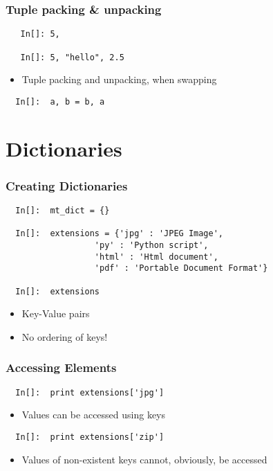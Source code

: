 \begin{frame}[fragile]
  \frametitle{Tuple packing \& unpacking}
  \begin{lstlisting}
   In[]: 5,

   In[]: 5, "hello", 2.5
  \end{lstlisting}
  \begin{itemize}
  \item Tuple packing and unpacking, when swapping
  \end{itemize}
  \begin{lstlisting}
  In[]:  a, b = b, a
  \end{lstlisting}
\end{frame}

\section{Dictionaries}

\begin{frame}[fragile]
  \frametitle{Creating Dictionaries}
  \begin{lstlisting}
  In[]:  mt_dict = {}

  In[]:  extensions = {'jpg' : 'JPEG Image', 
                  'py' : 'Python script', 
                  'html' : 'Html document', 
                  'pdf' : 'Portable Document Format'}

  In[]:  extensions
  \end{lstlisting}
  \begin{itemize}
  \item Key-Value pairs
  \item \alert{ No ordering of keys! }
  \end{itemize}
\end{frame}

\begin{frame}[fragile]
  \frametitle{Accessing Elements}
  \begin{lstlisting}
  In[]:  print extensions['jpg']
  \end{lstlisting}
  \begin{itemize}
  \item Values can be accessed using keys
  \end{itemize}
  \begin{lstlisting}
  In[]:  print extensions['zip']
  \end{lstlisting}
  \begin{itemize}
  \item Values of non-existent keys cannot, obviously, be accessed
  \end{itemize}
\end{frame}

